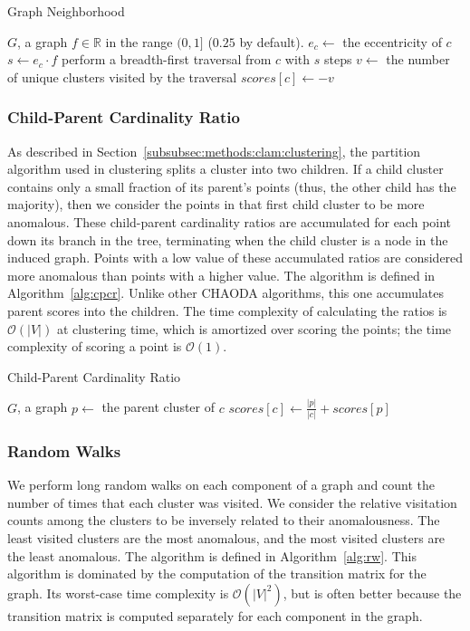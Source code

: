 \begin{algorithm}[h]
    \caption{Graph Neighborhood}
    \label{alg:gns}
\begin{algorithmic}[1]
    \REQUIRE $G$, a graph
    \REQUIRE $f \in \mathbb{R}$ in the range $(0,1]$ ($0.25$ by default).
        \STATE $e_c \gets$ the eccentricity of $c$
        \STATE $s \gets e_c \cdot f$
        \STATE perform a breadth-first traversal from $c$ with $s$ steps
        \STATE $v \gets$ the number of unique clusters visited by the traversal
        \STATE $scores[c] \gets -v$
    \ENDFOR
\end{algorithmic}
\end{algorithm}

\subsubsection{Child-Parent Cardinality Ratio}
\label{subsubsec:methods:individual-algorithms:cpcr}
As described in Section~\ref{subsubsec:methods:clam:clustering}, the partition algorithm used in clustering splits a cluster into two children.
If a child cluster contains only a small fraction of its parent's points (thus, the other child has the majority), then we consider the points in that first child cluster to be more anomalous.
These child-parent cardinality ratios are accumulated for each point down its branch in the tree, terminating when the child cluster is a node in the induced graph.
Points with a low value of these accumulated ratios are considered more anomalous than points with a higher value.
The algorithm is defined in Algorithm~\ref{alg:cpcr}.
Unlike other CHAODA algorithms, this one accumulates parent scores into the children.
The time complexity of calculating the ratios is $\mathcal{O}(|V|)$ at clustering time, which is amortized over scoring the points;
the time complexity of scoring a point is $\mathcal{O}(1)$.

\begin{algorithm}[h]
    \caption{Child-Parent Cardinality Ratio}
    \label{alg:cpcr}
\begin{algorithmic}[1]
    \REQUIRE $G$, a graph
        \STATE $p \gets$ the parent cluster of $c$
        \STATE $scores[c] \gets \frac{|p|}{|c|} + scores[p]$
    \ENDFOR
\end{algorithmic}
\end{algorithm}

\subsubsection{Random Walks}
We perform long random walks on each component of a graph and count the number of times that each cluster was visited.
We consider the relative visitation counts among the clusters to be inversely related to their anomalousness.
The least visited clusters are the most anomalous, and the most visited clusters are the least anomalous.
The algorithm is defined in Algorithm~\ref{alg:rw}.
This algorithm is dominated by the computation of the transition matrix for the graph.
Its worst-case time complexity is $\mathcal{O}(|V|^2)$, but is often better because the transition matrix is computed separately for each component in the graph.

